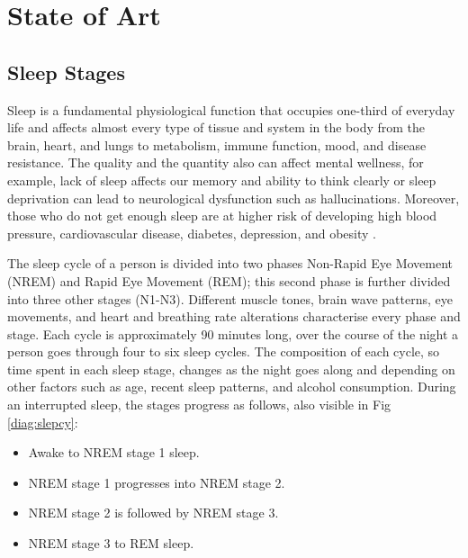 \chapter{State of Art}
\section{Sleep Stages} \label{cap:sleepStages}

Sleep is a fundamental physiological function that occupies one-third of everyday life and affects almost every type of tissue and system in the body from the brain, heart, and lungs to metabolism, immune function, mood, and disease resistance. The quality and the quantity also can affect mental wellness, for example, lack of sleep affects our memory and ability to think clearly or sleep deprivation can lead to neurological dysfunction such as hallucinations. Moreover, those who do not get enough sleep are at higher risk of developing high blood pressure, cardiovascular disease, diabetes, depression, and obesity \cite{Colten2006SleepProblem}.

The sleep cycle of a person is divided into two phases Non-Rapid Eye Movement (NREM) and Rapid Eye Movement (REM); 
this second phase is further divided into three other stages (N1-N3). 
Different muscle tones, brain wave patterns, eye movements, and heart and breathing rate alterations characterise every phase and stage. Each cycle is approximately 90 minutes long, over the course of the night a person goes through four to six 
sleep cycles\cite{Patel2022PhysiologyStages}. The composition of each cycle, so time spent in each sleep stage, changes as the night goes along and depending on other factors such as age, recent sleep patterns, and alcohol consumption. 
During an interrupted sleep, the stages progress as follows, also visible in Fig \ref{diag:slepcy}:
\begin{itemize}
    \item Awake to NREM stage 1 sleep.
    \item NREM stage 1 progresses into NREM stage 2.
    \item NREM stage 2 is followed by NREM stage 3.
    \item NREM stage 3 to REM sleep.  
\end{itemize}


